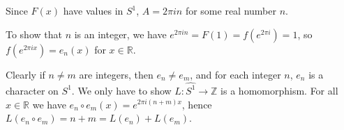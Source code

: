 \documentclass{article}
\begin{document}
\begin{enumerate}
\begin{solution}
        Since $F(x)$ have values in $S^1$, $A=2\pi in$ for some real number $n$.

        To show that $n$ is an integer, we have $e^{2\pi in} = F(1)=f(e^{2\pi i}) = 1$, so $f(e^{2\pi ix})=e_n(x)$ for $x\in\mathbb R$.

        Clearly if $n\neq m$ are integers, then $e_n\neq e_m$, and for each integer $n$, $e_n$ is a character on $S^1$. We only have to show
        $L: \widehat{S^1} \to \mathbb Z$ is a homomorphism. For all $x\in\mathbb R$ we have $e_n\circ e_m(x) = e^{2\pi i(n+m)x}$,
        hence $L(e_n\circ e_m) = n+m = L(e_n) + L(e_m)$.
    \end{solution}
\end{enumerate}
\end{document}
